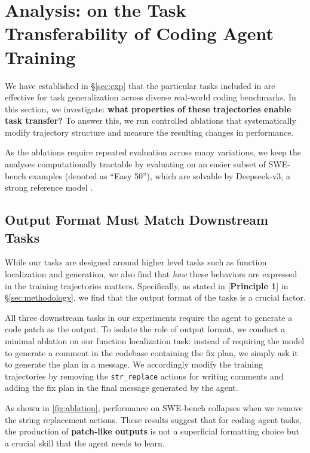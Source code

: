 \documentclass{article}
\theoremstyle{plain}
\theoremstyle{definition}
\theoremstyle{remark}
\begin{document}
\section{Analysis: on the Task Transferability of Coding Agent Training}
\label{sec:controlled-exp}

We have established in \S\ref{sec:exp} that the particular tasks included in \methodName are effective for task generalization across diverse real-world coding benchmarks. 
In this section, we investigate: \textbf{what properties of these trajectories enable task transfer?}
To answer this, we run controlled ablations that systematically modify trajectory structure and measure the resulting changes in performance.

As the ablations require repeated evaluation across many variations, we keep the analyses computationally tractable by evaluating on an easier subset of SWE-bench examples (denoted as ``Easy 50''), which are solvable by Deepseek-v3, a strong reference model \cite{deepseekv3}. 



\subsection{Output Format Must Match Downstream Tasks}
While our tasks are designed around higher level tasks such as function localization and generation, we also find that \textit{how} these behaviors are expressed in the training trajectories matters. Specifically, as stated in [\textbf{Principle 1}] in \S\ref{sec:methodology}, we find that the output format of the tasks is a crucial factor.

All three downstream tasks in our experiments require the agent to generate a code patch as the output. To isolate the role of output format, we conduct a minimal ablation on our function localization task: instead of requiring the model to generate a comment in the codebase containing the fix plan, we simply ask it to generate the plan in a message.
We accordingly modify the training trajectories by removing the \texttt{str\_replace} actions for writing comments and adding the fix plan in the final message generated by the agent.


As shown in \autoref{fig:ablation}, performance on SWE-bench collapses when we remove the string replacement actions. These results suggest that for coding agent tasks, the production of \textbf{patch-like outputs} is not a superficial formatting choice but a crucial skill that the agent needs to learn. 
\end{document}
